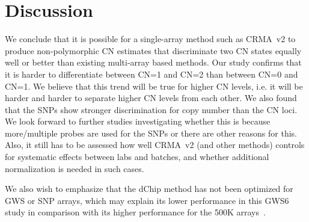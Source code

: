 \documentclass{bioinfo}
\newcommand{\GWS}{GWS\xspace}
\newcommand{\GWSSix}{GWS6\xspace}
\begin{document}
\section{Discussion}
\label{secDiscussion}
We conclude that it is possible for a single-array method such as CRMA~v2 to produce non-polymorphic CN estimates that discriminate two CN states equally well or better than existing multi-array based methods.
Our study confirms that it is harder to differentiate between CN=1 and CN=2 than between CN=0 and CN=1.  We believe that this trend will be true for higher CN levels, i.e. it will be harder and harder to separate higher CN levels from each other.
We also found that the SNPs show stronger discrimination for copy number than the CN loci.
We look forward to further studies investigating whether this is because more/multiple probes are used for the SNPs or there are other reasons for this.
Also, it still has to be assessed how well CRMA~v2 (and other methods) controls for systematic effects between labs and batches, and whether additional normalization is needed in such cases.

We also wish to emphasize that the dChip method has not been optimized for \GWS or SNP arrays, which may explain its lower performance in this \GWSSix study in comparison with its higher performance for the 500K arrays~\citep{BengtssonH_etal_2008}.


\end{document}
